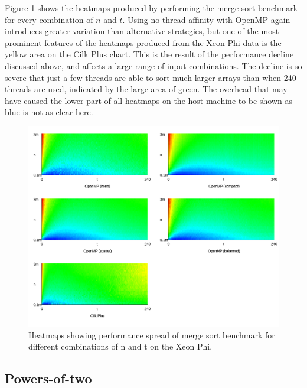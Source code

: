 \documentclass{report}
\begin{document}
Figure \ref{Fig:msortmicheatmap} shows the heatmaps produced by performing the merge sort benchmark for every combination of \(n\) and \(t\). Using no thread affinity with OpenMP again introduces greater variation than alternative strategies, but one of the most prominent features of the heatmaps produced from the Xeon Phi data is the yellow area on the Cilk Plus chart. This is the result of the performance decline discussed above, and affects a large range of input combinations. The decline is so severe that just a few threads are able to sort much larger arrays than when 240 threads are used, indicated by the large area of green. The overhead that may have caused the lower part of all heatmaps on the host machine to be shown as blue is not as clear here.
\noindent
\begin{figure}[t!]
	\includegraphics[width=\linewidth]{../../heatmaps/mic/msort}
	\caption{Heatmaps showing performance spread of merge sort benchmark for different combinations of n and t on the Xeon Phi.}
	\label{Fig:msortmicheatmap}
\end{figure}

\subsection{Powers-of-two} \label{Sec:evalmsortpowers}
\end{document}
